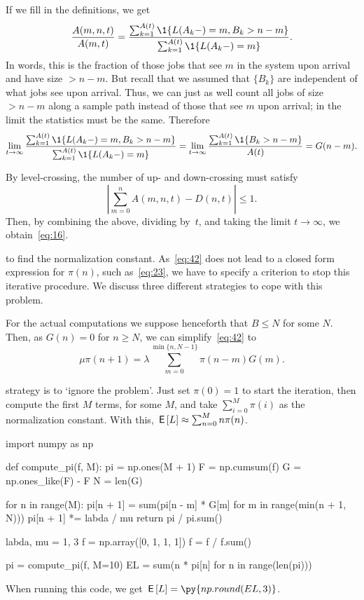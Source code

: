 If we fill in the definitions, we get
\begin{equation*}
 \frac{A(m,n,t)}{A(m,t)} =  \frac{\sum_{k=1}^{A(t)}\1{\L(A_k-) = m, B_k > n-m}}
{\sum_{k=1}^{A(t)}\1{\L(A_k-) = m}}.
\end{equation*}
In words, this is the fraction of those jobs that see $m$ in the system upon arrival and have size $> n-m$.
But recall that we assumed that  $\{B_k\}$  are independent of what jobs see upon arrival.
Thus, we can just as well count all jobs of size $>n-m$ along a sample path instead of those that see $m$ upon arrival; in the limit the statistics must be the same. Therefore 
\begin{equation*}
\lim_{t\to\infty}  \frac{\sum_{k=1}^{A(t)}\1{\L(A_k-) = m, B_k > n-m}}
{\sum_{k=1}^{A(t)}\1{\L(A_k-) = m}} = \lim_{t\to\infty} 
\frac{\sum_{k=1}^{A(t)}\1{B_k > n-m}}{A(t)}= G(n-m).
\end{equation*}


By level-crossing, the number of up- and down-crossing  must satisfy
\begin{equation*}
\left|\sum_{m=0}^n A(m,n,t) -  D(n,t)\right| \leq 1.
\end{equation*}
Then, by combining the above, dividing by~$t$, and taking the limit $t\to\infty$, we obtain~\cref{eq:16}. 


 to find the normalization constant.
As~\cref{eq:42} does not lead to a closed form expression for $\pi(n)$, such as~\cref{eq:23}, we have to specify a criterion to stop this iterative procedure.
We discuss three different strategies to cope with this problem.

For the actual computations we suppose henceforth that $B\leq N$ for some $N$.
Then, as $G(n)=0$ for $n\geq N$, we can simplify~\cref{eq:42} to
\begin{equation*}
\mu \pi(n+1) = \lambda \sum_{m=0}^{\min\{n, N-1\}} \pi(n-m) G(m).
\end{equation*}



 strategy is to `ignore the problem'.
Just set $\pi(0)=1$ to start the iteration, then compute the first $M$ terms, for some $M$, and take $\sum_{i=0}^M \pi(i)$ as the normalization constant.
With this, $\,\mathsf{E}\left[L\right] \approx \sum_{n=0}^M n \pi(n)$.

\begin{pyblock}[][numbers=left,frame=lines]
import numpy as np


def compute_pi(f, M):
    pi = np.ones(M + 1)
    F = np.cumsum(f)
    G = np.ones_like(F) - F
    N = len(G)

    for n in range(M):
        pi[n + 1] = sum(pi[n - m] * G[m] for m in range(min(n + 1, N)))
        pi[n + 1] *= labda / mu
    return pi / pi.sum()

labda, mu = 1, 3
f = np.array([0, 1, 1, 1])
f = f / f.sum()

pi = compute_pi(f, M=10)
EL = sum(n * pi[n] for n in range(len(pi)))
\end{pyblock}
When running this code, we get $\E\L = \py{np.round(EL,3)}$.

